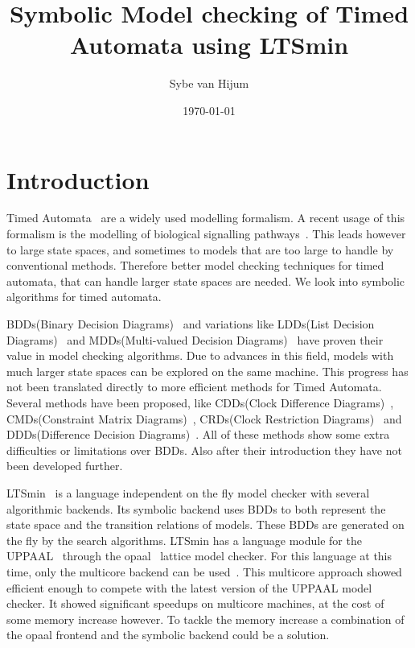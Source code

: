 \documentclass[11pt]{article}
\begin{document}
\newtheorem{mydef}{Definition}
\title{Symbolic Model checking of Timed Automata using LTSmin}
\author{Sybe van Hijum}
\date{\today}
\maketitle

\tableofcontents

\section{Introduction}
Timed Automata~\cite{Alur1994183} are a widely used modelling formalism. A recent usage of this formalism is the modelling of biological signalling pathways~\cite{DBLP:conf/bibe/SchivoSWCVKLPP12}. This leads however to large state spaces, and sometimes to models that are too large to handle by conventional methods. Therefore better model checking techniques for timed automata, that can handle larger state spaces are needed. We look into symbolic algorithms for timed automata.

BDDs(Binary Decision Diagrams)~\cite{Akers:1978:BDD:1310167.1310815,1676819} and variations like LDDs(List Decision Diagrams)~\cite{so62465} and MDDs(Multi-valued Decision Diagrams)~\cite{129849} have proven their value in model checking algorithms. Due to advances in this field, models with much larger state spaces can be explored on the same machine. This progress has not been translated directly to more efficient methods for Timed Automata. Several methods have been proposed, like CDDs(Clock Difference Diagrams)~\cite{BRICS19491}, CMDs(Constraint Matrix Diagrams)~\cite{5702245}, CRDs(Clock Restriction Diagrams)~\cite{crds} and DDDs(Difference Decision Diagrams)~\cite{ddds, ddd-datastructure-99}. All of these methods show some extra difficulties or limitations over BDDs. Also after their introduction they have not been developed further.

LTSmin~\cite{eemcs18152,ltsmin-mc:nmf2011} is a language independent on the fly model checker with several algorithmic backends. Its symbolic backend uses BDDs to both represent the state space and the transition relations of models. These BDDs are generated on the fly by the search algorithms. LTSmin has a language module for the UPPAAL~\cite{UPPAAL} through the opaal~\cite{opaal} lattice model checker. For this language at this time, only the multicore backend can be used~\cite{eemcs21972}. This multicore approach showed efficient enough to compete with the latest version of the UPPAAL model checker. It showed significant speedups on multicore machines, at the cost of some memory increase however. To tackle the memory increase a combination of the opaal frontend and the symbolic backend could be a solution.
\end{document}

